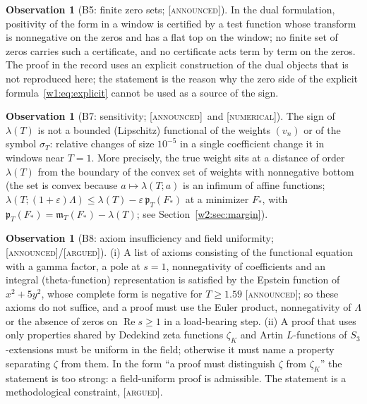 \documentclass[11pt]{amsart}
\theoremstyle{definition}
\newtheorem{observation}[theorem]{Observation}
\theoremstyle{remark}
\numberwithin{equation}{section}
\DeclareMathOperator{\Rel}{Re}
\newcommand{\mT}{\mathfrak{m}_T}                       %
\newcommand{\pT}{\mathfrak{p}_T}                       %
\newcommand{\sT}{\sigma_T}                             %
\newcommand{\lam}{\lambda(T)}                          %
\newcommand{\stag}[1]{\textsc{[#1]}}
\newcommand{\ARGUED}{\stag{argued}}
\newcommand{\NUM}{\stag{numerical}}
\newcommand{\ANNOUNCED}{\stag{announced}}
\begin{document}
\begin{observation}[B5: finite zero sets; \ANNOUNCED]\label{w3:bar:B5}
In the dual formulation, positivity of the form in a window is certified by a test function whose transform is
nonnegative on the zeros and has a flat top on the window; no finite set of zeros carries such a certificate,
and no certificate acts term by term on the zeros. The proof in the record uses an explicit construction of the
dual objects that is not reproduced here; the statement is the reason why the zero side of the explicit
formula~\eqref{w1:eq:explicit} cannot be used as a source of the sign.
\end{observation}

\begin{observation}[B7: sensitivity; \ANNOUNCED\ and \NUM]\label{w3:bar:B7}
The sign of $\lam$ is not a bounded (Lipschitz) functional of the weights $(v_n)$ or of the symbol $\sT$:
relative changes of size $10^{-5}$ in a single coefficient change it in windows near $T=1$. More precisely, the
true weight sits at a distance of order $\lam$ from the boundary of the convex set of weights with
nonnegative bottom (the set is convex because $a\mapsto\lambda(T;a)$ is an infimum of affine functions;
$\lambda(T;(1+\varepsilon)\Lambda)\le\lam-\varepsilon\,\pT(F_*)$ at a minimizer $F_*$, with
$\pT(F_*)=\mT(F_*)-\lam$; see Section~\ref{w2:sec:margin}).
\end{observation}

\begin{observation}[B8: axiom insufficiency and field uniformity; \ANNOUNCED/\ARGUED]\label{w3:bar:B8}
(i) A list of axioms consisting of the functional equation with a gamma factor, a pole at $s=1$, nonnegativity
of coefficients and an integral (theta-function) representation is satisfied by the Epstein function of
$x^2+5y^2$, whose complete form is negative for $T\ge1.59$ \ANNOUNCED; so these axioms do not suffice, and a proof
must use the Euler product, nonnegativity of $\Lambda$ or the absence of zeros on $\Rel s\ge1$ in a load-bearing
step. (ii) A proof that uses only properties shared by Dedekind zeta functions $\zeta_K$ and Artin
$L$-functions of $S_3$-extensions must be uniform in the field; otherwise it must name a property separating
$\zeta$ from them. In the form ``a proof must distinguish $\zeta$ from $\zeta_K$'' the statement is too strong: a
field-uniform proof is admissible. The statement is a methodological constraint, \ARGUED.
\end{observation}
\end{document}
